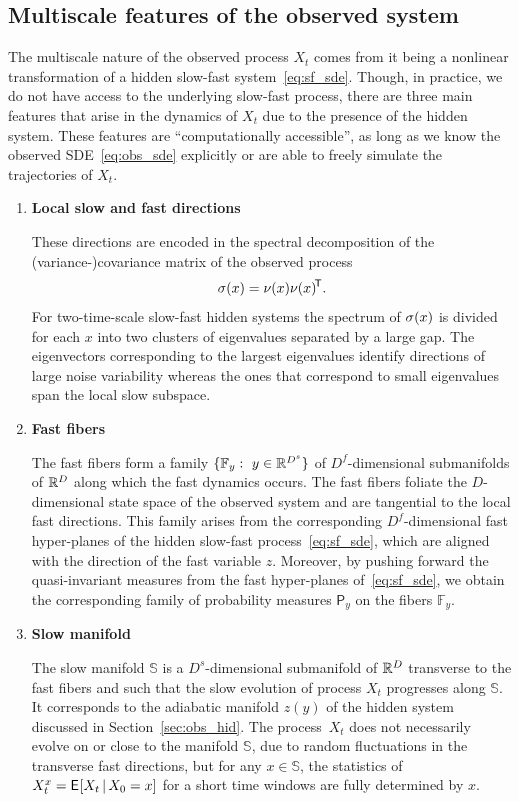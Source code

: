 \documentclass{article}
\newcommand{\ffib}{\mathbb{F}} %
\newcommand{\sman}{\mathbb{S}} %
\newcommand{\invm}{\mathsf{P}} %
\begin{document}
\subsection{Multiscale features of the observed system}
\label{sec:features_obs}
The multiscale nature of the observed process $X_t$ comes from it being a nonlinear transformation of a hidden slow-fast system~\eqref{eq:sf_sde}. Though, in practice, we do not have access to the underlying slow-fast process, there are three main features that arise in the dynamics of $X_t$ due to the presence of the hidden system. These features are ``computationally accessible'', as long as we know the observed SDE~\eqref{eq:obs_sde} explicitly or are able to freely simulate the trajectories of $X_t$.

\begin{enumerate}
    \item \textbf{Local slow and fast directions}
    
    These directions are encoded in the spectral decomposition of the (variance-)covariance matrix of the observed process
    \begin{equation}\label{eq:var_cov}
        \si(x) = \nu(x)\tp{\nu(x)}.
    \end{equation}
    For two-time-scale slow-fast hidden systems the spectrum of $\si(x)$ is divided for each $x$ into two clusters of eigenvalues separated by a large gap. The eigenvectors corresponding to the largest eigenvalues identify directions of large noise variability whereas the ones that correspond to small eigenvalues span the local slow subspace.
    
    \item \textbf{Fast fibers}
    
    The fast fibers form a family $\{\ffib_y:\ y\in\R^{D^s}\}$ of $D^f$-dimensional submanifolds of $\R^D$ along which the fast dynamics occurs. The fast fibers foliate the $D$-dimensional state space of the observed system and are tangential to the local fast directions. This family arises from the corresponding $D^f$-dimensional fast hyper-planes of the hidden slow-fast process~\eqref{eq:sf_sde}, which are aligned with the direction of the fast variable $z$. Moreover, by pushing forward the quasi-invariant measures from the fast hyper-planes of~\eqref{eq:sf_sde}, we obtain the corresponding family of probability measures $\invm_{\!y}$ on the fibers $\ffib_y$.
    
    \item \textbf{Slow manifold}
    
    The slow manifold $\sman$ is a $D^s$-dimensional submanifold of $\R^D$ transverse to the fast fibers and such that the slow evolution of process $X_t$ progresses along $\sman$. It corresponds to the adiabatic manifold $z(y)$ of the hidden system discussed in Section~\ref{sec:obs_hid}. The process~$X_t$ does not necessarily evolve on or close to the manifold $\sman$, due to random fluctuations in the transverse fast directions, but for any $x\in\sman$, the statistics of $X^x_t = \Exp[][X_t\cbar X_0=x]$ for a short time windows are fully determined by $x$.
\end{enumerate}
\end{document}
